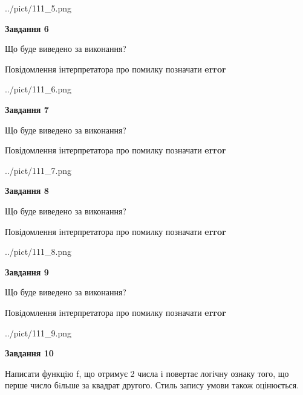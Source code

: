 \documentclass[12pt, ukrainian]{article}
\begin{document}
{\begin {large}
\begin{center}
	{../pict/111_5.png}
\end{center}
\newpage

{\begin {center}\textbf{Завдання 6}\end {center}}\par
Що буде виведено за виконання? \par
Повідомлення інтерпретатора про помилку позначати \textbf{error}

\begin{center}
	{../pict/111_6.png}
\end{center}
\newpage

{\begin {center}\textbf{Завдання 7}\end {center}}\par
Що буде виведено за виконання? \par
Повідомлення інтерпретатора про помилку позначати \textbf{error}

\begin{center}
	{../pict/111_7.png}
\end{center}
\newpage

{\begin {center}\textbf{Завдання 8}\end {center}}\par
Що буде виведено за виконання? \par
Повідомлення інтерпретатора про помилку позначати \textbf{error}

\begin{center}
	{../pict/111_8.png}
\end{center}
\newpage

{\begin {center}\textbf{Завдання 9}\end {center}}\par
Що буде виведено за виконання? \par
Повідомлення інтерпретатора про помилку позначати \textbf{error}

\begin{center}
	{../pict/111_9.png}
\end{center}
\newpage

{\begin {center}\textbf{Завдання 10}\end {center}}\par

Написати функцiю f, що отримує 2 числа і повертає логічну ознаку того, що перше число бiльше за квадрат другого. Стиль запису умови також оцінюється.\par
\newpage

\end {large}}
\end{document}
